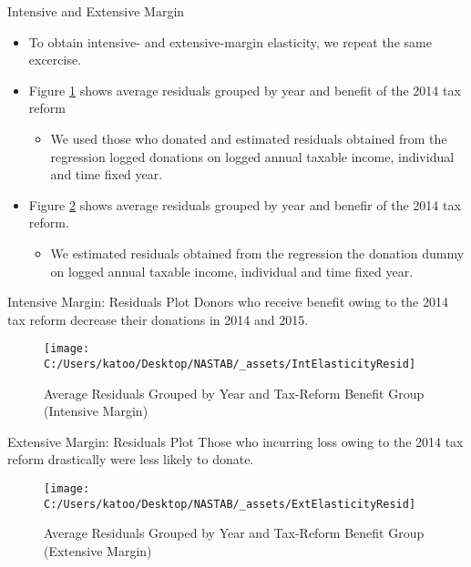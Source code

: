 \documentclass[
  ignorenonframetext,
]{beamer}
\providecommand{\tightlist}{%
  \setlength{\itemsep}{0pt}\setlength{\parskip}{0pt}}
\begin{document}
\begin{frame}{Intensive and Extensive Margin}
\protect\hypertarget{intensive-and-extensive-margin}{}
\begin{itemize}
\tightlist
\item
  To obtain intensive- and extensive-margin elasticity, we repeat the same excercise.
\item
  Figure \ref{fig:showIntElasticityResid} shows average residuals grouped by year and benefit of the 2014 tax reform

  \begin{itemize}
  \tightlist
  \item
    We used those who donated and estimated residuals obtained from the regression logged donations on logged annual taxable income, individual and time fixed year.
  \end{itemize}
\item
  Figure \ref{fig:showExtElasticityResid} shows average residuals grouped by year and benefir of the 2014 tax reform.

  \begin{itemize}
  \tightlist
  \item
    We estimated residuals obtained from the regression the donation dummy on logged annual taxable income, individual and time fixed year.
  \end{itemize}
\end{itemize}
\end{frame}

\begin{frame}{Intensive Margin: Residuals Plot}
\protect\hypertarget{intensive-margin-residuals-plot}{}
Donors who receive benefit owing to the 2014 tax reform decrease their donations in 2014 and 2015.

\begin{figure}

{\centering \texttt{[image: C:/Users/katoo/Desktop/NASTAB/\_assets/IntElasticityResid]} 

}

\caption{Average Residuals Grouped by Year and Tax-Reform Benefit Group (Intensive Margin)}\label{fig:showIntElasticityResid}
\end{figure}
\end{frame}

\begin{frame}{Extensive Margin: Residuals Plot}
\protect\hypertarget{extensive-margin-residuals-plot}{}
Those who incurring loss owing to the 2014 tax reform drastically were less likely to donate.

\begin{figure}

{\centering \texttt{[image: C:/Users/katoo/Desktop/NASTAB/\_assets/ExtElasticityResid]} 

}

\caption{Average Residuals Grouped by Year and Tax-Reform Benefit Group (Extensive Margin)}\label{fig:showExtElasticityResid}
\end{figure}
\end{frame}
\end{document}
